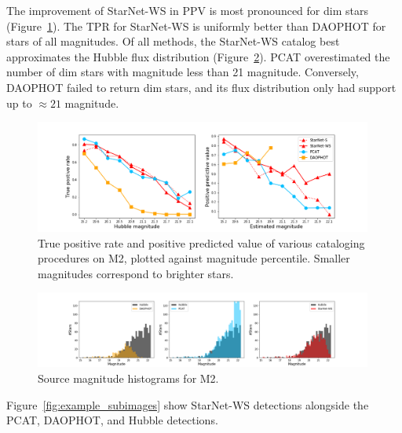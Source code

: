 

The improvement of StarNet-WS in PPV is most pronounced for dim stars (Figure~\ref{fig:summary_stats}). The TPR for StarNet-WS is uniformly better than DAOPHOT for stars of all magnitudes. 
Of all methods, the StarNet-WS catalog best approximates the Hubble flux distribution (Figure~\ref{fig:luminosity_fun_m2}). 
PCAT overestimated the number of dim stars with magnitude less than 21 magnitude. 
Conversely, DAOPHOT failed to return dim stars, and its flux distribution only had support up to $\approx21$ magnitude.

\begin{figure}[ht]
    \centering
    \includegraphics[width=0.99\textwidth]{figures/summary_statistics_m2.png}
    \caption{True positive rate and positive predicted value of various cataloging
    procedures on M2, plotted against magnitude percentile.
    Smaller magnitudes correspond to brighter stars. }
    \label{fig:summary_stats}
\end{figure}

\begin{figure}[ht]
    \centering
    \includegraphics[width=0.99\textwidth]{figures/luminosity_fun.png}
    \caption{Source magnitude histograms for M2. }
    \label{fig:luminosity_fun_m2}
\end{figure}

Figure~\ref{fig:example_subimages} show StarNet-WS detections alongside the PCAT, DAOPHOT, and Hubble detections. 

